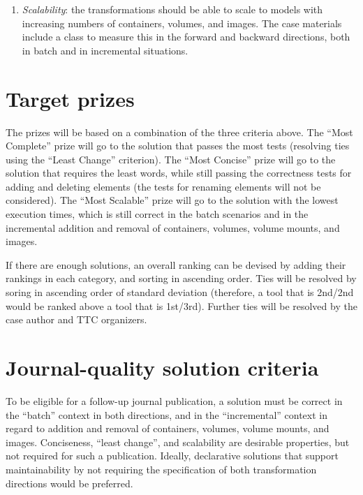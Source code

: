 \documentclass[sigconf,review]{acmart}
\begin{document}
\begin{enumerate}
\item \emph{Scalability}: the transformations should be able to scale to models
  with increasing numbers of containers, volumes, and images. The case materials
  include a  class to measure this in the
  forward and backward directions, both in batch and in incremental situations.

\end{enumerate}


\section{Target prizes}

The prizes will be based on a combination of the three criteria above. The
``Most Complete'' prize will go to the solution that passes the most tests
(resolving ties using the ``Least Change'' criterion). The ``Most Concise''
prize will go to the solution that requires the least words, while still passing
the correctness tests for adding and deleting elements (the tests for renaming
elements will not be considered). The ``Most Scalable'' prize will go to the
solution with the lowest execution times, which is still correct in the batch
scenarios and in the incremental addition and removal of containers, volumes,
volume mounts, and images.

If there are enough solutions, an overall ranking can be devised by adding their
rankings in each category, and sorting in ascending order. Ties will be resolved
by soring in ascending order of standard deviation (therefore, a tool that is
2nd/2nd would be ranked above a tool that is 1st/3rd). Further ties will be
resolved by the case author and TTC organizers.

\section{Journal-quality solution criteria}

To be eligible for a follow-up journal publication, a solution must be correct
in the ``batch'' context in both directions, and in the ``incremental'' context
in regard to addition and removal of containers, volumes, volume mounts, and
images. Conciseness, ``least change'', and scalability are desirable properties,
but not required for such a publication. Ideally, declarative solutions that
support maintainability by not requiring the specification of both
transformation directions would be preferred.



\end{document}
